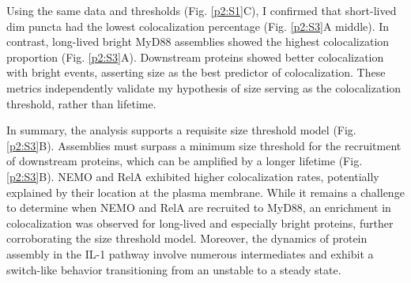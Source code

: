 Using the same data and thresholds (Fig. \ref{p2:S1}C), I confirmed that short-lived dim puncta had the lowest colocalization percentage (Fig. \ref{p2:S3}A middle). In contrast, long-lived bright MyD88 assemblies showed the highest colocalization proportion (Fig. \ref{p2:S3}A). Downstream proteins showed better colocalization with bright events, asserting size as the best predictor of colocalization. These metrics independently validate my hypothesis of size serving as the colocalization threshold, rather than lifetime.

In summary, the analysis supports a requisite size threshold model (Fig. \ref{p2:S3}B). Assemblies must surpass a minimum size threshold for the recruitment of downstream proteins, which can be amplified by a longer lifetime (Fig. \ref{p2:S3}B). NEMO and RelA exhibited higher colocalization rates, potentially explained by their location at the plasma membrane. While it remains a challenge to determine when NEMO and RelA are recruited to MyD88, an enrichment in colocalization was observed for long-lived and especially bright proteins, further corroborating the size threshold model. Moreover, the dynamics of protein assembly in the IL-1 pathway involve numerous intermediates and exhibit a switch-like behavior transitioning from an unstable to a steady state.


